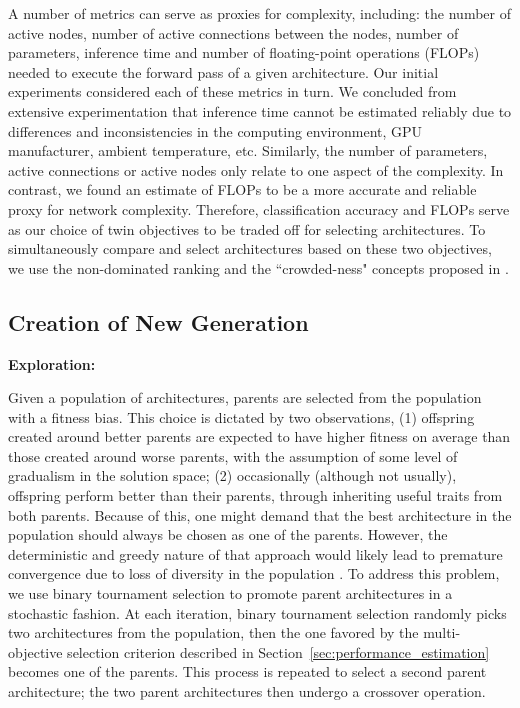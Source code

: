 \documentclass[journal]{IEEEtran}
\theoremstyle{definition}
\theoremstyle{remark}
\begin{document}
A number of metrics can serve as proxies for complexity, including: the number of active nodes, number of active connections between the nodes, number of parameters, inference time and {number of floating-point operations (FLOPs) needed to execute the forward pass of a given architecture.} Our initial experiments considered each of these metrics in turn. We concluded from extensive experimentation that inference time cannot be estimated reliably due to differences and inconsistencies in the computing environment, GPU manufacturer, ambient temperature, etc. {Similarly, the number of parameters, active connections or active nodes only relate to one aspect of the complexity.} In contrast, we found an estimate of FLOPs to be a more accurate and reliable proxy for network complexity. Therefore, classification accuracy and FLOPs serve as our choice of twin objectives to be traded off for selecting architectures. To simultaneously compare and select architectures based on these two objectives, we use the non-dominated ranking and the ``crowded-ness" concepts proposed in \cite{deb2002fast}.

\vspace{-2mm}
{
\subsection{Creation of New Generation}\label{sec:reproduction}
\noindent\textbf{Exploration:}} Given a population of architectures, parents are selected from the population with a fitness bias. This choice is dictated by two observations, (1) offspring created around better parents are expected to have higher fitness on average than those created around worse parents, with the assumption of some level of gradualism in the solution space; (2) occasionally (although not usually), offspring perform better than their parents, through inheriting useful traits from both parents. Because of this, one might demand that the best architecture in the population should always be chosen as one of the parents. However, the deterministic and greedy nature of that approach would likely lead to premature convergence due to loss of diversity in the population \cite{leung1997degree}. {To address this problem, we use binary tournament selection \cite{miller1995genetic} to promote parent architectures in a stochastic fashion. At each iteration, binary tournament selection randomly picks two architectures from the population, then the one favored by the {multi-objective} selection criterion described in Section~\ref{sec:performance_estimation} becomes one of the parents. This process is repeated to select a second parent architecture; the two parent architectures then undergo a crossover operation.}
\end{document}
